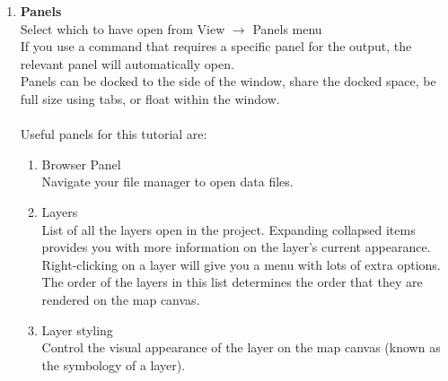 \begin{enumerate}[~~~1)]



	\item
	\textbf{Panels}\\ 
Select which to have open from View $\rightarrow$ Panels menu\\
If you use a command that requires a specific panel for the output, the relevant panel will automatically open.\\
Panels can be docked to the side of the window, share the docked space, be		full size using tabs, or float within the window.\\
\\
Useful panels for this tutorial are:	
\begin{enumerate}
	\item
Browser Panel\\
Navigate your file manager to open data files.
	\item
Layers\\
List of all the layers open in the project.  Expanding collapsed items provides you with more information on the layer’s current appearance. Right-clicking on a layer will give you a menu with lots of extra options. The order of the layers in this list determines the order that they are rendered on the map canvas.
	\item
Layer styling\\
Control the visual appearance of the layer on the map canvas (known as the symbology of a layer). \\

\end{enumerate}


\end{enumerate}

